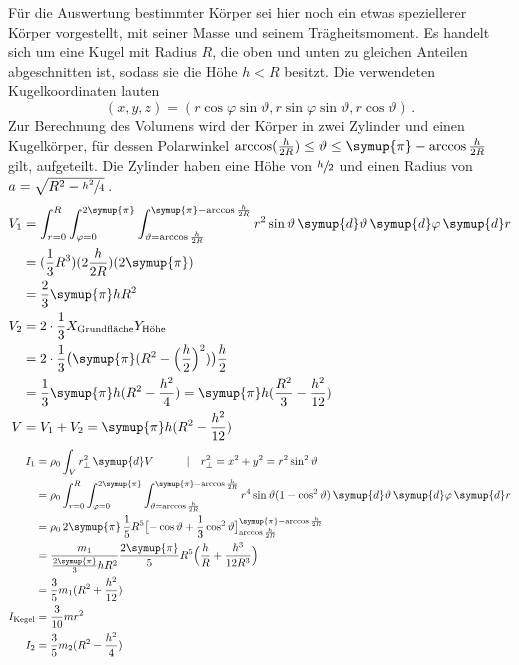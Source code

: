 Für die Auswertung bestimmter Körper sei hier noch ein etwas speziellerer Körper vorgestellt, mit seiner Masse und seinem 
Trägheitsmoment. 
Es handelt sich um eine Kugel mit Radius $R$, die oben und unten zu gleichen Anteilen \glqq abgeschnitten\grqq{} ist, sodass 
sie die Höhe ${h<R}$ besitzt. 
Die verwendeten Kugelkoordinaten lauten 
\begin{equation}
    (x,y,z)=(r\cos \varphi \sin \vartheta, r\sin \varphi \sin \vartheta, r\cos \vartheta) \,.
\end{equation}
Zur Berechnung des Volumens wird der Körper in zwei Zylinder und einen Kugelkörper, für dessen Polarwinkel 
${\arccos (\frac{h}{2R})\le\vartheta\le\symup{\pi}-\arccos{\frac{h}{2R}}}$ gilt, aufgeteilt. 
Die Zylinder haben eine Höhe von ${\sfrac{h}{2}}$ und einen Radius von ${a=\sqrt{R^2-\sfrac{h^2}{4}}}\,$. 
\begin{align}
    V_1&=\int_{r=0}^R \int_{\varphi=0}^{2\symup{\pi}} \int_{\vartheta=\arccos{\frac{h}{2R}}}^{\symup{\pi}-\arccos{\frac{h}{2R}}} 
        r^2\sin{\vartheta} \, \symup{d}\vartheta \, \symup{d}\varphi \, \symup{d}r \\
        &= (\frac{1}{3}R^3) (2\frac{h}{2R}) (2\symup{\pi}) \\
        &= \frac{2}{3}\symup{\pi}hR^2 \\
    V_2&= 2\cdot\frac{1}{3} X_\text{Grundfläche} Y_\text{Höhe} \\
        &= 2\cdot\frac{1}{3} \bigl(\symup{\pi} (R^2-\Bigl(\frac{h}{2}\Bigr)^2)\bigr) \frac{h}{2} \\
        &= \frac{1}{3}\symup{\pi}h(R^2-\frac{h^2}{4}) = \symup{\pi}h(\frac{R^2}{3}-\frac{h^2}{12}) \\
    V&=V_1+V_2=\symup{\pi}h(R^2-\frac{h^2}{12})
\end{align}
\begin{align}
    I_1&=\rho _0 \int_V r_{\perp}^2 \, \symup{d}V 
        \quad \quad \quad |\quad r_{\perp}^2=x^2+y^2=r^2\sin ^2\vartheta \\
        &= \rho _0  \int_{r=0}^R \int_{\varphi=0}^{2\symup{\pi}} \int_{\vartheta=\arccos{\frac{h}{2R}}}^{\symup{\pi}-\arccos{\frac{h}{2R}}} 
        r^4\sin{\vartheta}(1-\cos ^2\vartheta) \, \symup{d}\vartheta \, \symup{d}\varphi \, \symup{d}r \\
        &= \rho _0 \, 2\symup{\pi} \, \frac{1}{5} R^5 \bigl[-\cos{\vartheta}+\frac{1}{3}\cos ^2\vartheta\bigr]_{\arccos \frac{h}{2R}}^{\symup{\pi}-\arccos \frac{h}{2R}} \\
        &= \frac{m_1}{\frac{2\symup{\pi}}{3}hR^2} \frac{2\symup{\pi}}{5} R^5 \Bigl(\frac{h}{R} + \frac{h^3}{12R^3}\Bigr) \\
        &= \frac{3}{5}m_1(R^2+\frac{h^2}{12}) \\
    I_\text{Kegel}&=\frac{3}{10}mr^2 \\
    I_2&=\frac{3}{5}m_2(R^2-\frac{h^2}{4}) \\
\end{align}
